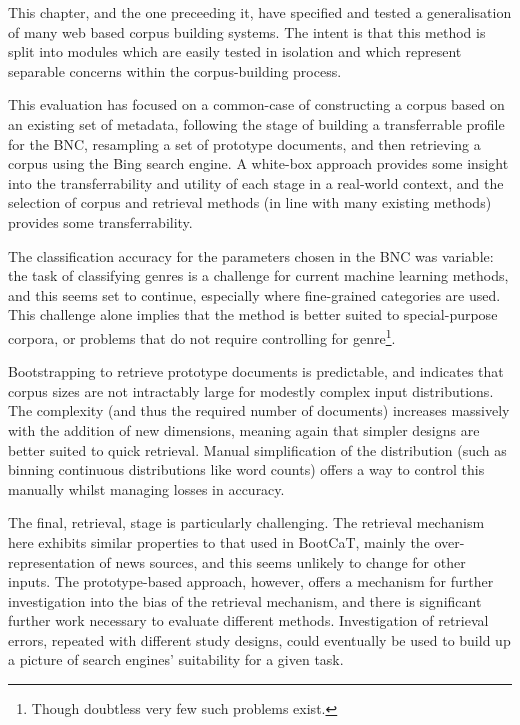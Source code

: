 
This chapter, and the one preceeding it, have specified and tested a generalisation of many web based corpus building systems.  The intent is that this method is split into modules which are easily tested in isolation and which represent separable concerns within the corpus-building process.

This evaluation has focused on a common-case of constructing a corpus based on an existing set of metadata, following the stage of building a transferrable profile for the BNC, resampling a set of prototype documents, and then retrieving a corpus using the Bing search engine.  A white-box approach provides some insight into the transferrability and utility of each stage in a real-world context, and the selection of corpus and retrieval methods (in line with many existing methods) provides some transferrability.



The classification accuracy for the parameters chosen in the BNC was variable: the task of classifying genres is a challenge for current machine learning methods, and this seems set to continue, especially where fine-grained categories are used.  This challenge alone implies that the method is better suited to special-purpose corpora, or problems that do not require controlling for genre\footnote{Though doubtless very few such problems exist.}.

Bootstrapping to retrieve prototype documents is predictable, and indicates that corpus sizes are not intractably large for modestly complex input distributions.  The complexity (and thus the required number of documents) increases massively with the addition of new dimensions, meaning again that simpler designs are better suited to quick retrieval.  Manual simplification of the distribution (such as binning continuous distributions like word counts) offers a way to control this manually whilst managing losses in accuracy.

The final, retrieval, stage is particularly challenging.  The retrieval mechanism here exhibits similar properties to that used in BootCaT, mainly the over-representation of news sources, and this seems unlikely to change for other inputs.  The prototype-based approach, however, offers a mechanism for further investigation into the bias of the retrieval mechanism, and there is significant further work necessary to evaluate different methods.  Investigation of retrieval errors, repeated with different study designs, could eventually be used to build up a picture of search engines' suitability for a given task.

